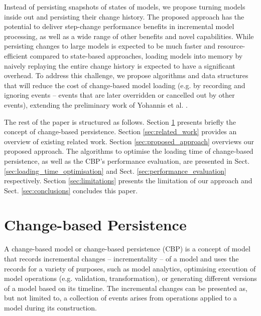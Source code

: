 \documentclass{llncs}
\begin{document}
Instead of persisting snapshots of states of models, we propose turning models inside out and persisting their change history. The proposed approach has the potential to deliver step-change performance benefits in incremental model processing, as well as a wide range of other benefits and novel capabilities. While persisting changes to large models is expected to be much faster and resource-efficient compared to state-based approaches, loading models into memory by naively replaying the entire change history is expected to have a significant overhead. To address this challenge, we propose algorithms and data structures that will reduce the cost of change-based model loading (e.g. by recording and ignoring events -- events that are later overridden or cancelled out by other events), extending the preliminary work of Yohannis et al. \cite{yohannis2017turning}.

The rest of the paper is structured as follows. Section \ref{sec:change_based_persistence} presents briefly the concept of change-based persistence. Section \ref{sec:related_work} provides an overview of existing related work. Section \ref{sec:proposed_approach} overviews our proposed approach. The algorithms to optimise the loading time of change-based persistence, as well as the CBP's performance evaluation, are presented in Sect. \ref{sec:loading_time_optimisation} and Sect. \ref{sec:performance_evaluation} respectively. 
Section \ref{sec:limitations} presents the limitation of our approach and Sect. \ref{sec:conclusions} concludes this paper.

\section{Change-based Persistence}
\label{sec:change_based_persistence}
A change-based model or change-based persistence (CBP) is a concept of model that records incremental changes -- incrementality -- of a model and uses the records for a variety of purposes, such as model analytics, optimising execution of model operations (e.g. validation, transformation), or generating different versions of a model based on its timeline. The incremental changes can be presented as, but not limited to, a collection of events arises from operations applied to a model during its construction. 
\end{document}

